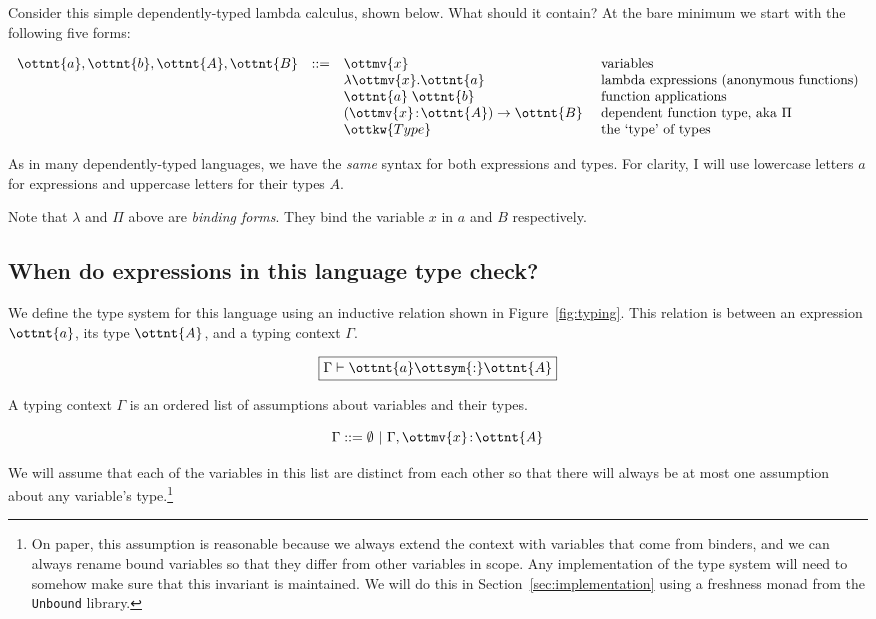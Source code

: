 \documentclass{article}
\newcommand\unbound{\texttt{Unbound}\xspace}
\theoremstyle{definition}
\begin{document}
Consider this simple dependently-typed lambda calculus, shown below. What should it
contain? At the bare minimum we start with the following five forms:

\[
\begin{array}{rcll}
     \ottnt{a},\ottnt{b},\ottnt{A},\ottnt{B} & ::=& \ottmv{x}  &\mbox{ variables  }\\
         && \lambda  \ottmv{x} .  \ottnt{a}           &\mbox{ lambda expressions (anonymous functions)} \\
         && \ottnt{a}  \;  \ottnt{b}             &\mbox{ function applications }\\
         && ( \ottmv{x} \!:\! \ottnt{A} )  \to   \ottnt{B}      &\mbox{ dependent function type, aka $\Pi$ }\\
         &&\ottkw{Type}           &\mbox{ the `type' of types}\\
\end{array}
\]

As in many dependently-typed languages, we have the \emph{same} syntax for
both expressions and types. For clarity, I will use lowercase letters $a$ for
expressions and uppercase letters for their types $A$.

Note that $\lambda$ and $\Pi$ above are \emph{binding forms}. They bind the
variable $x$ in $a$ and $B$ respectively.

\subsection{When do expressions in this language type check?}

We define the type system for this language using an inductive
relation shown in Figure~\ref{fig:typing}. This relation is between an
expression $\ottnt{a}$, its type $\ottnt{A}$, and a typing context $\Gamma$.

\[ \fbox{$\Gamma  \vdash  \ottnt{a}  \ottsym{:}  \ottnt{A}$} \]

A typing context $\Gamma$ is an ordered list of assumptions about variables and
their types.

    \[ \Gamma  ::= \emptyset\ |\  \Gamma ,  \ottmv{x} \! :\! \ottnt{A}  \]

We will assume that each of the variables in this list are
distinct from each other so that there will always be at most one assumption
about any variable's type.\footnote{On paper, this assumption is reasonable
  because we always extend the context with variables that come from binders,
  and we can always rename bound variables so that they differ from other
  variables in scope. Any implementation of the type system will need to somehow
  make sure that this invariant is maintained. We will do this in Section~\ref{sec:implementation} using
  a freshness monad from the \unbound library.}
\end{document}
